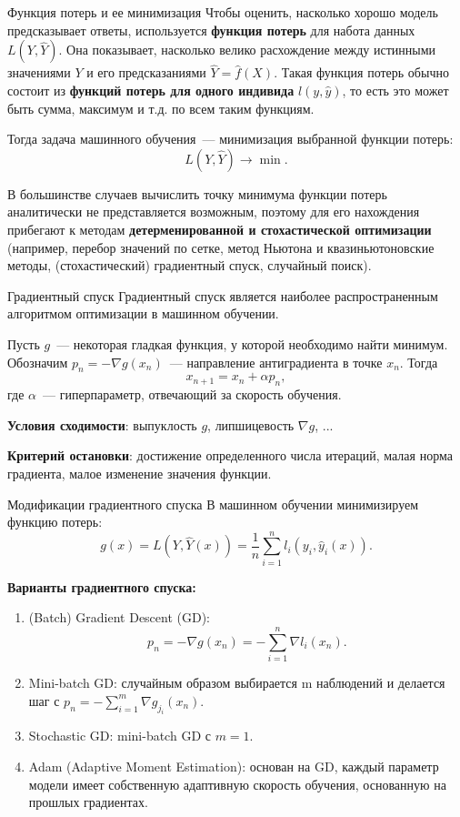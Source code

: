 \documentclass[notheorems, handout]{beamer}
\begin{document}
\begin{frame}{Функция потерь и ее минимизация}
	Чтобы оценить, насколько хорошо модель предсказывает ответы, используется {\bf функция потерь} для набота данных $L(Y, \hat{Y})$. Она показывает, насколько велико расхождение между истинными значениями $Y$ и его предсказаниями $\hat{Y} = \hat{f} (X)$. Такая функция потерь обычно состоит из {\bf функций потерь для одного индивида} $l(y, \hat{y})$, то есть это может быть сумма, максимум и т.д. по всем таким функциям.\smallskip

	Тогда задача машинного обучения~--- минимизация выбранной функции потерь:
	\[
		L(Y, \hat Y)\longrightarrow \min.
	\]\smallskip

	В большинстве случаев вычислить точку минимума функции потерь аналитически не представляется возможным, поэтому для его нахождения прибегают к методам \textbf{детерменированной и стохастической оптимизации} (например, перебор значений по сетке, метод Ньютона и квазиньютоновские методы, (стохастический) градиентный спуск, случайный поиск).
\end{frame}

\begin{frame}{Градиентный спуск}
	Градиентный спуск является наиболее распространенным алгоритмом оптимизации в машинном обучении.\medskip

	Пусть $g$~--- некоторая гладкая функция, у которой необходимо найти минимум. Обозначим $p_n=-\nabla g(x_n)$~--- направление антиградиента в точке $x_n$. Тогда
	\[
		x_{n+1}=x_n+\alpha p_n,
	\]
	где $\alpha$~--- гиперпараметр, отвечающий за скорость обучения.\medskip

	\textbf{Условия сходимости}: выпуклость $g$, липшицевость $\nabla g$, ...\medskip

	\textbf{Критерий остановки}: достижение определенного числа итераций, малая норма градиента, малое изменение значения функции.
\end{frame}

\begin{frame}{Модификации градиентного спуска}
	В машинном обучении минимизируем функцию потерь:
	\[
		g(x) = L(Y, \hat{Y} (x)) = \frac{1}{n} \sum _{i = 1} ^n l _i (y _i, \hat{y} _i (x)).
	\]\medskip

	{\bf Варианты градиентного спуска:}
	\begin{enumerate}
		\item (Batch) Gradient Descent (GD):
		      \[
			      p_n=-\nabla g(x_n)=-\sum_{i=1}^n \nabla l_i(x_n).
		      \]
		\item Mini-batch GD: случайным образом выбирается \textsf{m} наблюдений и делается шаг с $p_n=-\sum_{i=1}^m \nabla g_{j_i}(x_n)$.\smallskip
		\item Stochastic GD: mini-batch GD с $m=1$.\smallskip
		\item Adam (Adaptive Moment Estimation): основан на GD, каждый параметр модели имеет собственную адаптивную скорость обучения, основанную на прошлых градиентах.
	\end{enumerate}
\end{frame}
\end{document}
